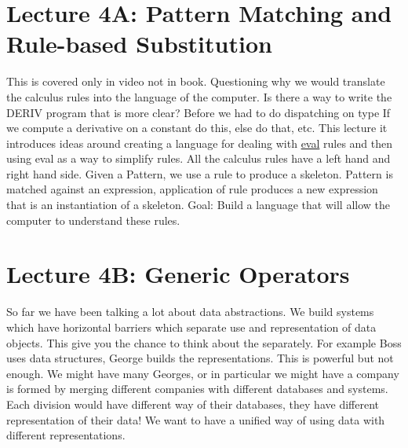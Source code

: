 \documentclass[a4paper,twoside]{article}
\numberwithin{equation}{section}
\begin{document}
\section{Lecture 4A: Pattern Matching and Rule-based Substitution}
This is covered only in video not in book.
Questioning why we would translate the calculus rules into the language of the computer.
Is there a way to write the DERIV program that is more clear? Before we had to do dispatching on type
If we compute a derivative on a constant do this, else do that, etc. This lecture  it introduces
ideas around creating a language for dealing with \href{https://en.wikipedia.org/wiki/Eval}{eval}
rules and then using eval as a way to simplify rules.
All the calculus rules have a left hand and right hand side.
Given a Pattern, we use a rule to produce a skeleton.
Pattern is matched against an expression, application of rule produces a new expression that is an
instantiation of a skeleton.
Goal: Build a language that will allow the computer to understand these rules.


\section{Lecture 4B: Generic Operators}
So far we have been talking a lot about data abstractions. We build systems which have horizontal
barriers which separate use and representation of data objects. This give you the chance to think
about the separately. For example Boss uses data structures, George builds the representations.
This is powerful but not enough. We might have many Georges, or in particular we might have a
company is formed by merging different companies with different databases and systems. Each
division would have different way of their databases, they have different representation of their
data! We want to have a unified way of using data with different representations.
\end{document}
